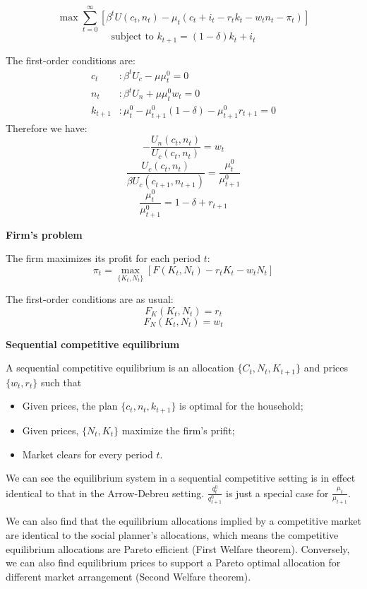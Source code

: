 \documentclass[10pt,a4]{article}
\begin{document}
$$\max \sum_{t=0}^{\infty}\left[\beta^t U(c_t, n_t) - \mu_t(c_t + i_t - r_tk_t - w_tn_t - \pi_t) \right]$$
$$\textrm{subject to } k_{t+1}=(1-\delta)k_t + i_t$$



The first-order conditions are:
\[
    \begin{aligned}
        c_t &: \beta^t U_c - \mu \mu_t^0 = 0 \\
        n_t &: \beta^t U_n + \mu \mu_t^0 w_t = 0 \\
        k_{t+1} &: \mu_t^0 - \mu_{t+1}^0 (1-\delta) - \mu_{t+1}^0 r_{t+1} = 0
    \end{aligned}
\]
Therefore we have:
$$ -\frac{U_n(c_t, n_t)}{U_c(c_t, n_t)} = w_t $$
$$ \frac{U_c(c_t, n_t)}{\beta U_c(c_{t+1}, n_{t+1})} = \frac{\mu_t^0}{\mu_{t+1}^0} $$
$$ \frac{\mu_t^0}{\mu_{t+1}^0} = 1-\delta + r_{t+1} $$

\textbf{Firm's problem}

\textbf{}

The firm maximizes its profit for each period $t$:
$$\pi_t = \max_{\{K_t,N_t\}} [F(K_t, N_t) - r_tK_t - w_tN_t]$$

The first-order conditions are as usual:
$$ F_K(K_t, N_t) = r_t $$
$$ F_N(K_t, N_t) = w_t $$

\textbf{Sequential competitive equilibrium}

\textbf{}

A sequential competitive equilibrium is an allocation $\{C_t, N_t, K_{t+1}\}$ and prices $\{w_t, r_t\}$ such that 
\begin{itemize}
\item Given prices, the plan $\{c_t, n_t, k_{t+1}\}$ is optimal for the household;
\item Given prices, $\{N_t, K_t\}$ maximize the firm's prifit;
\item Market clears for every period $t$.
\end{itemize}

We can see the equilibrium system in a sequential competitive setting is in effect identical to that in the Arrow-Debreu setting. $\frac{q_t^0}{q_{t+1}^0}$ is just a special case for $\frac{\mu_t}{\mu_{t+1}}$.

We can also find that the equilibrium allocations implied by a
competitive market are identical to the social planner's allocations,
which means the competitive equilibrium allocations are Pareto efficient
(First Welfare theorem). Conversely, we can also find equilibrium prices
to support a Pareto optimal allocation for different market arrangement
(Second Welfare theorem).~
\end{document}
